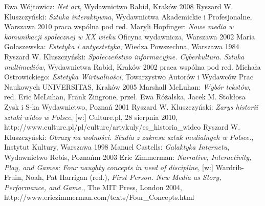 \documentclass[a4paper,12pt,twoside]{article}
\begin{document}
\begin{thebibliography}{6}
  Ewa Wójtowicz:
  \textit{Net art},
  Wydawnictwo Rabid, Kraków 2008
  Ryszard W. Kluszczyński:
  \textit{Sztuka interaktywna},
  Wydawnictwa Akademickie i Profesjonalne,
  Warszawa 2010
  praca wspólna pod red. Maryli Hopfinger:
  \textit{Nowe media w komunikacji społecznej w XX wieku}
  Oficyna wydawnicza,
  Warszawa 2002
  Maria Gołaszewska:
  \textit{Estetyka i antyestetyka},
  Wiedza Powszechna, Warszawa 1984
  Ryszard W. Kluszczyński:
  \textit{Społeczeństwo informacyjne. Cyberkultura. Sztuka multimediów},
  Wydawnictwa Rabid, Kraków 2002
  praca wspólna pod red. Michała Ostrowickiego:
  \textit{Estetyka Wirtualności},
  Towarzystwo Autorów i Wydawców Prac Naukowych UNIVERSITAS,
  Kraków 2005
  Marshall McLuhan:
  \textit{Wybór tekstów},
  red. Eric McLuhan, Frank Zingrone,
  przeł. Ewa Różalska, Jacek M. Stokłosa
  Zysk i S-ka Wydawnictwo, Poznań 2001
  Ryszard W. Kluszczyński:
  \textit{Zarys historii sztuki wideo w Polsce},
  [w:] Culture.pl, 28 sierpnia 2010,
  http://www.culture.pl/pl/culture/artykuly/es\_historia\_wideo
  Ryszard W. Kluszczyński:
  \textit{Obrazy na wolności. Studia z zakresu sztuk medialnych w Polsce.},
  Instytut Kultury, Warszawa 1998
  Manuel Castells:
  \textit{Galaktyka Internetu},
  Wydawnictwo Rebis, Poznańm 2003
  Eric Zimmerman:
  \textit{Narrative, Interactivity, Play, and Games: Four naughty concepts in need of discipline},
  [w:] Wardrib-Fruin, Noah, Pat Harrigan (red.),
  \textit{First Person. New Media as Story, Performance, and Game.},
  The MIT Press, London 2004,
  http://www.ericzimmerman.com/texts/Four\_Concepts.html

\end{thebibliography}
\end{document}

